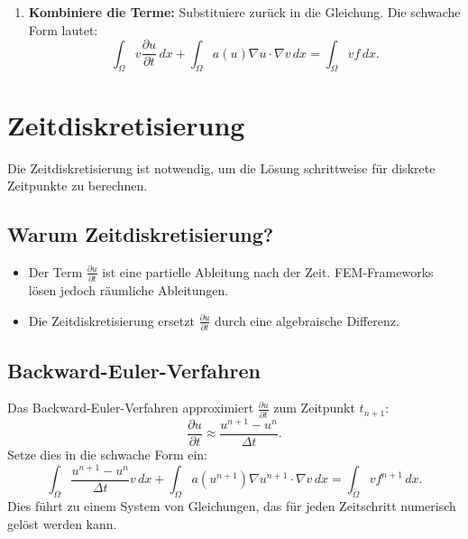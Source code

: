 \begin{enumerate}
	\item \textbf{Kombiniere die Terme:} Substituiere zurück in die Gleichung. Die schwache Form lautet:
	\begin{equation}
		\int_\Omega v \frac{\partial u}{\partial t} \, dx + \int_\Omega a(u) \nabla u \cdot \nabla v \, dx = \int_\Omega v f \, dx.
	\end{equation}
\end{enumerate}

\section{Zeitdiskretisierung}
Die Zeitdiskretisierung ist notwendig, um die Lösung schrittweise für diskrete Zeitpunkte zu berechnen.

\subsection{Warum Zeitdiskretisierung?}
\begin{itemize}
	\item Der Term $\frac{\partial u}{\partial t}$ ist eine partielle Ableitung nach der Zeit. FEM-Frameworks lösen jedoch räumliche Ableitungen.
	\item Die Zeitdiskretisierung ersetzt $\frac{\partial u}{\partial t}$ durch eine algebraische Differenz.
\end{itemize}

\subsection{Backward-Euler-Verfahren}
Das Backward-Euler-Verfahren approximiert $\frac{\partial u}{\partial t}$ zum Zeitpunkt $t_{n+1}$:
\begin{equation}
	\frac{\partial u}{\partial t} \approx \frac{u^{n+1} - u^n}{\Delta t}.
\end{equation}
Setze dies in die schwache Form ein:
\begin{equation}
	\int_\Omega \frac{u^{n+1} - u^n}{\Delta t} v \, dx + \int_\Omega a(u^{n+1}) \nabla u^{n+1} \cdot \nabla v \, dx = \int_\Omega v f^{n+1} \, dx.
\end{equation}
Dies führt zu einem System von Gleichungen, das für jeden Zeitschritt numerisch gelöst werden kann.

